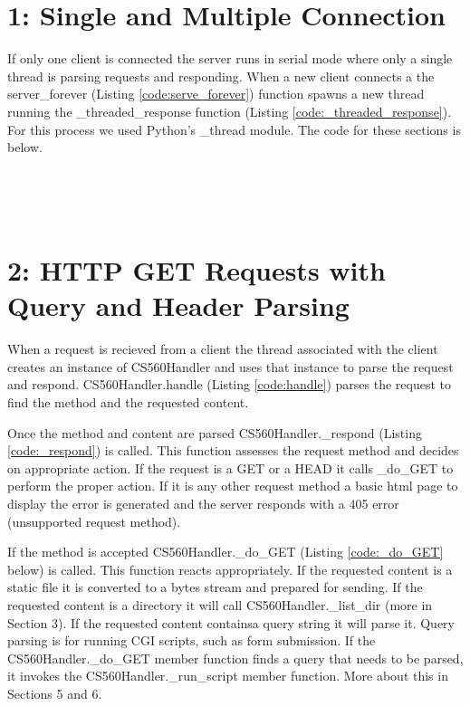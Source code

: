 \documentclass{article}
\begin{document}
\section*{1: Single and Multiple Connection}

If only one client is connected the server runs in serial mode where only a single thread is parsing requests and responding. When a new client connects a the server\_forever (Listing \ref{code:serve_forever}) function spawns a new thread running the \_threaded\_response function (Listing \ref{code:_threaded_response}). For this process we used Python's \_thread module. The code for these sections is below. 

	

\
	

\
\section*{2: HTTP GET Requests with Query and Header Parsing}

When a request is recieved from a client the thread associated with the client creates an instance of CS560Handler and uses that instance to parse the request and respond. CS560Handler.handle (Listing \ref{code:handle}) parses the request to find the method and the requested content. 

	
	
Once the method and content are parsed CS560Handler.\_respond (Listing \ref{code:_respond}) is called. This function assesses the request method and decides on appropriate action. If the request is a GET or a HEAD it calls \_do\_GET to perform the proper action. If it is any other request method a basic html page to display the error is generated and the server responds with a 405 error (unsupported request method).
 
	
	

If the method is accepted CS560Handler.\_do\_GET (Listing \ref{code:_do_GET} below) is called. This function reacts appropriately. If the requested content is a static file it is converted to a bytes stream and prepared for sending. If the requested content is a directory it will call CS560Handler.\_list\_dir (more in Section 3). If the requested content containsa query string it will parse it. Query parsing is for running CGI scripts, such as form submission. If the CS560Handler.\_do\_GET member function finds a query that needs to be parsed, it invokes the CS560Handler.\_run\_script member function. More about this in Sections 5 and 6. \\
\end{document}
